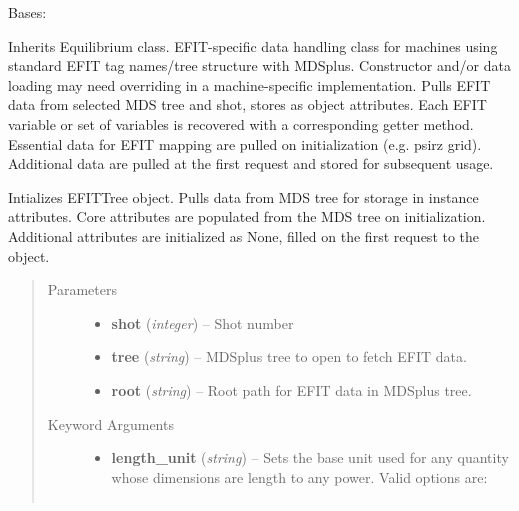 \documentclass[letterpaper,10pt,english]{sphinxmanual}
\begin{document}
\begin{fulllineitems}
\label{eqtools:eqtools.EFIT.EFITTree}
Bases: {\hyperref[eqtools:eqtools.core.Equilibrium]{}}

Inherits Equilibrium class. EFIT-specific data handling class for machines using
standard EFIT tag names/tree structure with MDSplus. Constructor and/or data loading may
need overriding in a machine-specific implementation.
Pulls EFIT data from selected MDS tree and shot, stores as object attributes.
Each EFIT variable or set of variables is recovered with a corresponding getter method.
Essential data for EFIT mapping are pulled on initialization (e.g. psirz grid).
Additional data are pulled at the first request and stored for subsequent usage.

Intializes EFITTree object. Pulls data from MDS tree for storage in
instance attributes. Core attributes are populated from the MDS tree
on initialization. Additional attributes are initialized as None,
filled on the first request to the object.
\begin{quote}\begin{description}
\item[{Parameters}] \leavevmode\begin{itemize}
\item {} 
\textbf{shot} (\emph{integer}) --
Shot number

\item {} 
\textbf{tree} (\emph{string}) --
MDSplus tree to open to fetch EFIT data.

\item {} 
\textbf{root} (\emph{string}) --
Root path for EFIT data in MDSplus tree.

\end{itemize}

\item[{Keyword Arguments}] \leavevmode\begin{itemize}
\item {} 
\textbf{length\_unit} (\emph{string}) --
Sets the base unit used for any
quantity whose dimensions are length to any power.
Valid options are:
\begin{quote}

\begin{tabulary}{\linewidth}{|L|L|}
\hline


\end{tabulary}
\end{quote}
\end{itemize}
\end{description}
\end{quote}
\end{fulllineitems}
\end{document}
